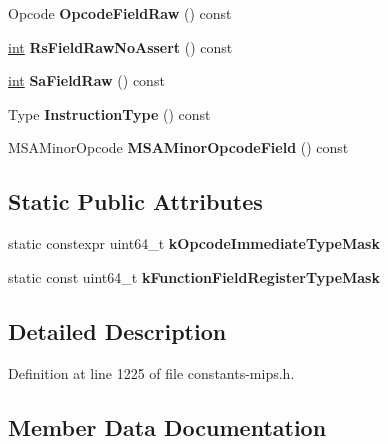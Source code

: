 \begin{DoxyCompactItemize}
\item 
\mbox{\label{classv8_1_1internal_1_1InstructionBase_a7f3016835875a7ea6f00b7e080a85dec}} 
Opcode {\bfseries Opcode\+Field\+Raw} () const
\item 
\mbox{\label{classv8_1_1internal_1_1InstructionBase_a38fbbe20848598dff95a765c07b68241}} 
\mbox{\hyperlink{classint}{int}} {\bfseries Rs\+Field\+Raw\+No\+Assert} () const
\item 
\mbox{\label{classv8_1_1internal_1_1InstructionBase_a2fbbd2c466574b050c72efaf71abfca0}} 
\mbox{\hyperlink{classint}{int}} {\bfseries Sa\+Field\+Raw} () const
\item 
\mbox{\label{classv8_1_1internal_1_1InstructionBase_a372cce2f45823051b7a7ae0e01c4864a}} 
Type {\bfseries Instruction\+Type} () const
\item 
\mbox{\label{classv8_1_1internal_1_1InstructionBase_a5c88371ce84d80dfd236cbc1db9f9185}} 
M\+S\+A\+Minor\+Opcode {\bfseries M\+S\+A\+Minor\+Opcode\+Field} () const
\end{DoxyCompactItemize}
\subsection*{Static Public Attributes}
\begin{DoxyCompactItemize}
\item 
static constexpr uint64\+\_\+t {\bfseries k\+Opcode\+Immediate\+Type\+Mask}
\item 
static const uint64\+\_\+t {\bfseries k\+Function\+Field\+Register\+Type\+Mask}
\end{DoxyCompactItemize}


\subsection{Detailed Description}


Definition at line 1225 of file constants-\/mips.\+h.



\subsection{Member Data Documentation}
\mbox{\label{classv8_1_1internal_1_1InstructionBase_a144163bd1b5b773b28105e089bf442a9}} 
